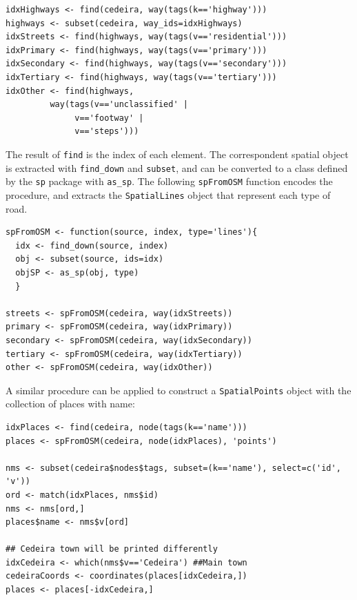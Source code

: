 \documentclass[smallroyalvopaper]{memoir}
\begin{document}

\lstset{language=R,numbers=none}
\begin{lstlisting}
idxHighways <- find(cedeira, way(tags(k=='highway')))
highways <- subset(cedeira, way_ids=idxHighways)
idxStreets <- find(highways, way(tags(v=='residential')))
idxPrimary <- find(highways, way(tags(v=='primary')))
idxSecondary <- find(highways, way(tags(v=='secondary')))
idxTertiary <- find(highways, way(tags(v=='tertiary')))
idxOther <- find(highways,
		 way(tags(v=='unclassified' |
			  v=='footway' |
			  v=='steps')))
\end{lstlisting}

The result of \texttt{find} is the index of each element. The correspondent
spatial object is extracted with \texttt{find\_down} and \texttt{subset}, and can be
converted to a class defined by the \texttt{sp} package with \texttt{as\_sp}. The
following \texttt{spFromOSM} function encodes the procedure, and extracts the
\texttt{SpatialLines} object that represent each type of road.


\lstset{language=R,numbers=none}
\begin{lstlisting}
spFromOSM <- function(source, index, type='lines'){
  idx <- find_down(source, index)
  obj <- subset(source, ids=idx)
  objSP <- as_sp(obj, type)
  }

streets <- spFromOSM(cedeira, way(idxStreets))
primary <- spFromOSM(cedeira, way(idxPrimary))
secondary <- spFromOSM(cedeira, way(idxSecondary))
tertiary <- spFromOSM(cedeira, way(idxTertiary))
other <- spFromOSM(cedeira, way(idxOther))
\end{lstlisting}

A similar procedure can be applied to construct a \texttt{SpatialPoints}
object with the collection of places with name:


\lstset{language=R,numbers=none}
\begin{lstlisting}
idxPlaces <- find(cedeira, node(tags(k=='name')))
places <- spFromOSM(cedeira, node(idxPlaces), 'points')

nms <- subset(cedeira$nodes$tags, subset=(k=='name'), select=c('id', 'v'))
ord <- match(idxPlaces, nms$id)
nms <- nms[ord,]
places$name <- nms$v[ord]

## Cedeira town will be printed differently
idxCedeira <- which(nms$v=='Cedeira') ##Main town
cedeiraCoords <- coordinates(places[idxCedeira,])
places <- places[-idxCedeira,]
\end{lstlisting}
\end{document}
